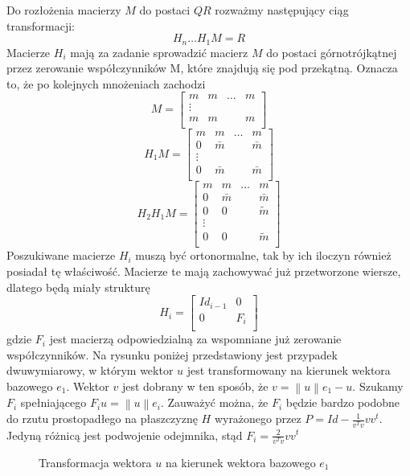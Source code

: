 \documentclass[11pt,wide]{mwart}
\newcommand{\norm}[1]{\left\lVert#1\right\rVert}
\begin{document}
Do rozłożenia macierzy $M$ do postaci $QR$ rozważmy następujący ciąg transformacji:
 $$H_n \dots H_1 M = R$$
Macierze $H_i$ mają za zadanie sprowadzić macierz $M$ do postaci górnotrójkątnej przez zerowanie współczynników M, które znajdują się pod przekątną. Oznacza to, że po kolejnych mnożeniach zachodzi
$$M= \begin{bmatrix} 
 m & m & \dots&m\\
 \vdots&& &\\
 m & m & &m\\
\end{bmatrix}$$
$$H_1 M= \begin{bmatrix} 
 m & m & \dots&m\\
 0 & \bar{m} & &\bar{m}\\
 \vdots&& &\\
 0 & \bar{m}& &\bar{m}\\
\end{bmatrix}$$
$$H_2H_1 M= \begin{bmatrix} 
 m & m & \dots&m\\
 0 & \bar{m} & &\bar{m}\\
  0 & 0 & &\tilde{m}\\
 \vdots&& &\\
 0 & 0& &\tilde{m}\\
\end{bmatrix}$$
Poszukiwane macierze $H_i$ muszą być ortonormalne, tak by ich iloczyn również posiadał tę właściwość. Macierze te mają zachowywać już przetworzone wiersze, dlatego będą miały strukturę
$$H_i= \begin{bmatrix} 
Id_{i-1}& 0\\
0& F_i\\
\end{bmatrix}$$
gdzie $F_i$ jest macierzą odpowiedzialną za wspomniane już zerowanie współczynników. Na rysunku poniżej przedstawiony jest przypadek dwuwymiarowy, w którym wektor $u$ jest transformowany na kierunek wektora bazowego $e_1$.  Wektor $v$ jest dobrany w ten sposób, że $v  = \norm{u}e_1-u$. Szukamy $F_i$ spełniającego $F_iu = \norm{u}e_i$. Zauważyć można, że $F_i$ będzie bardzo podobne do rzutu prostopadłego na płaszczyznę $H$ wyrażonego przez $P=Id-\frac{1}{v^Tv}vv^t$. Jedyną różnicą jest podwojenie odejmnika, stąd $F_i =\frac{2}{v^Tv}vv^t $
\begin{figure}[H]
\centering
{}
\caption{Transformacja wektora $u$ na kierunek wektora bazowego $e_1$} \label{C1}
\end{figure}
\end{document}
